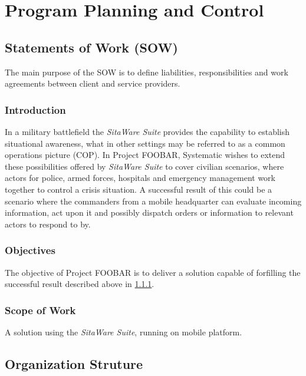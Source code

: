 %
\thispagestyle{fancy}
\chapter{Program Planning and Control}
\label{chp:program_plan}


\section{Statements of Work (SOW)}
The main purpose of the SOW is to define liabilities, responsibilities and work agreements between client and service providers.

\subsection{Introduction}\label{sec:sow_intro}
In a military battlefield the \emph{SitaWare Suite} provides the capability to establish situational awareness, what in other settings may be referred to as a common operations picture (COP).
In Project FOOBAR, Systematic wishes to extend these possibilities offered by \emph{SitaWare Suite} to cover civilian scenarios, where actors for police, armed forces, hospitals and emergency management work together to control a crisis situation.
A successful result of this could be a scenario where the commanders from a mobile headquarter can evaluate incoming information, act upon it and possibly dispatch orders or information to relevant actors to respond to by.

\subsection{Objectives}
The objective of Project FOOBAR is to deliver a solution capable of forfilling the successful result described above in \ref{sec:sow_intro}.

\subsection{Scope of Work}
A solution using the \emph{SitaWare Suite}, running on mobile platform.



\section{Organization Struture}

